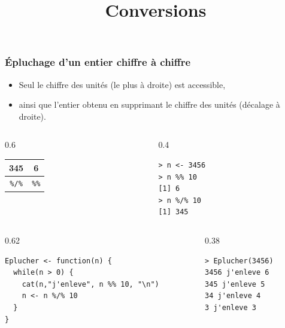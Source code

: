 \documentclass[10pt]{beamer}
\title{Conversions}
\begin{document}
\maketitle



\begin{frame}[fragile]
  \frametitle{Épluchage d'un entier chiffre à chiffre}

  \begin{itemize}
  \item Seul le chiffre des unités (le plus à droite) est accessible,
  \item ainsi que l'entier obtenu en supprimant le chiffre des unités (décalage à droite).
  \end{itemize}

  \begin{columns}[c]
    \begin{column}{0.6\textwidth}
      \begin{center}
  \begin{tabular}{c|c}
    \toprule
    345 & 6 \\
    \midrule
    \texttt{\%/\%} &     \texttt{\%\%} \\
    \bottomrule
  \end{tabular}
\end{center}
\end{column}
\begin{column}{0.4\textwidth}
  \begin{lstlisting}
> n <- 3456
> n %% 10
[1] 6
> n %/% 10
[1] 345
\end{lstlisting}
\end{column}
\end{columns}



\begin{columns}[t]
\begin{column}{0.62\textwidth}
\begin{lstlisting}[style=editor]
Eplucher <- function(n) {
  while(n > 0) {
    cat(n,"j'enleve", n %% 10, "\n")
    n <- n %/% 10
  }
}
\end{lstlisting}
\end{column}
\begin{column}{0.38\textwidth}
\begin{lstlisting}
> Eplucher(3456)
3456 j'enleve 6
345 j'enleve 5
34 j'enleve 4
3 j'enleve 3
\end{lstlisting}
\end{column}
\end{columns}

\end{frame}
\end{document}
